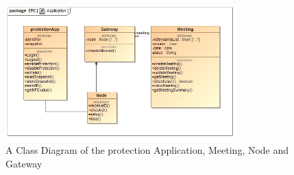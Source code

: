 \documentclass[a4paper,12pt,titlepage]{article}
\begin{document}
		\begin{figure}[h!]
 			 \centering
			  \includegraphics[width=0.8\textwidth]{ApplicationClass}
		 	 \caption{A Class Diagram of the protection Application, Meeting, Node and Gateway}
		\end{figure}
\end{document}

